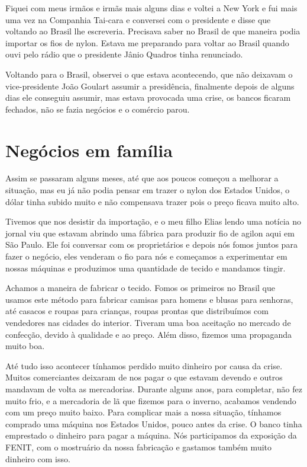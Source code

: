 Fiquei com meus irmãos e irmãs mais alguns dias e voltei a New York e
fui mais uma vez na Companhia Tai-cara e conversei com o presidente e
disse que voltando ao Brasil lhe escreveria. Precisava saber no Brasil
de que maneira podia importar os fios de nylon. Estava me preparando
para voltar ao Brasil quando ouvi pelo rádio que o presidente Jânio
Quadros tinha renunciado.

Voltando para o Brasil, observei o que estava acontecendo, que não
deixavam o vice-presidente João Goulart assumir a presidência,
finalmente depois de alguns dias ele conseguiu assumir, mas estava
provocada uma crise, os bancos ficaram fechados, não se fazia negócios e
o comércio parou.

\chapter{Negócios em família}

Assim se passaram alguns meses, até que aos poucos começou a melhorar a
situação, mas eu já não podia pensar em trazer o nylon dos Estados
Unidos, o dólar tinha subido muito e não compensava trazer pois o preço
ficava muito alto.

Tivemos que nos desistir da importação, e o meu filho Elias lendo uma
notícia no jornal viu que estavam abrindo uma fábrica para produzir fio
de agilon aqui em São Paulo. Ele foi conversar com os proprietários e
depois nós fomos juntos para fazer o negócio, eles venderam o fio para
nós e começamos a experimentar em nossas máquinas e produzimos uma
quantidade de tecido e mandamos tingir.

Achamos a maneira de fabricar o tecido. Fomos os primeiros no Brasil que
usamos este método para fabricar camisas para homens e blusas para
senhoras, até casacos e roupas para crianças, roupas prontas que
distribuímos com vendedores nas cidades do interior. Tiveram uma boa
aceitação no mercado de confecção, devido à qualidade e ao preço. Além
disso, fizemos uma propaganda muito boa.

Até tudo isso acontecer tínhamos perdido muito dinheiro por causa da
crise. Muitos comerciantes deixaram de nos pagar o que estavam devendo e
outros mandavam de volta as mercadorias. Durante alguns anos, para
completar, não fez muito frio, e a mercadoria de lã que fizemos para o
inverno, acabamos vendendo com um preço muito baixo. Para complicar mais
a nossa situação, tínhamos comprado uma máquina nos Estados Unidos,
pouco antes da crise. O banco tinha emprestado o dinheiro para pagar a
máquina. Nós participamos da exposição da FENIT, com o mostruário da
nossa fabricação e gastamos também muito dinheiro com isso.

